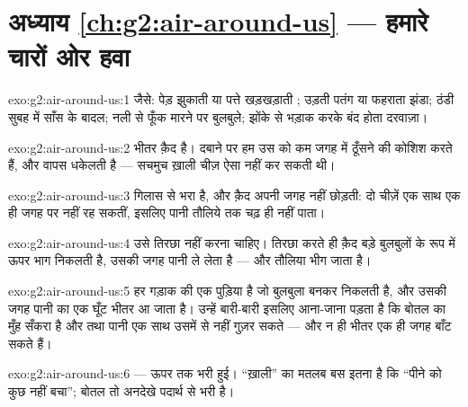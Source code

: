 \section*{अध्याय \ref{ch:g2:air-around-us} --- हमारे चारों ओर हवा}

\begin{solution}{exo:g2:air-around-us:1}
जैसे: पेड़ झुकाती या पत्ते खड़खड़ाती ; उड़ती पतंग या फहराता झंडा;
ठंडी सुबह में साँस के बादल; नली से फूँक मारने पर बुलबुले; झोंके से
भड़ाक करके बंद होता दरवाज़ा।
\end{solution}

\begin{solution}{exo:g2:air-around-us:2}
भीतर  क़ैद है। दबाने पर हम उस  को कम जगह में ठूँसने की कोशिश
करते हैं, और  वापस धकेलती है --- सचमुच ख़ाली चीज़ ऐसा नहीं कर
सकती थी।
\end{solution}

\begin{solution}{exo:g2:air-around-us:3}
गिलास  से भरा है, और क़ैद  अपनी जगह नहीं छोड़ती: दो चीज़ें एक
साथ एक ही जगह पर नहीं रह सकतीं, इसलिए पानी तौलिये तक चढ़ ही नहीं
पाता।
\end{solution}

\begin{solution}{exo:g2:air-around-us:4}
उसे तिरछा नहीं करना चाहिए। तिरछा करते ही क़ैद  बड़े बुलबुलों के
रूप में ऊपर भाग निकलती है, उसकी जगह पानी ले लेता है --- और तौलिया
भीग जाता है।
\end{solution}

\begin{solution}{exo:g2:air-around-us:5}
हर गड़ाक  की एक पुड़िया है जो बुलबुला बनकर निकलती है, और उसकी जगह
पानी का एक घूँट भीतर आ जाता है। उन्हें बारी-बारी इसलिए आना-जाना पड़ता
है कि बोतल का मुँह सँकरा है और  तथा पानी एक साथ उसमें से नहीं गुज़र
सकते --- और न ही भीतर एक ही जगह बाँट सकते हैं।
\end{solution}

\begin{solution}{exo:g2:air-around-us:6}
 --- ऊपर तक भरी हुई। ``ख़ाली'' का मतलब बस इतना है कि ``पीने को कुछ
नहीं बचा''; बोतल तो अनदेखे पदार्थ से भरी है।
\end{solution}

